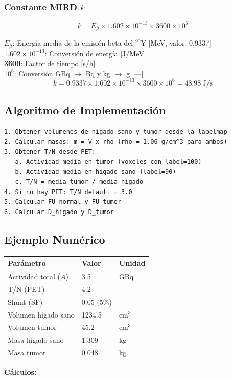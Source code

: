 \documentclass[12pt,a4paper]{article}
\newcommand{\vardef}[2]{\noindent\textbf{#1}: #2\\}
\begin{document}
\subsubsection{Constante MIRD $k$}

$$k = E_{\beta} \times 1.602\times10^{-13} \times 3600 \times 10^6$$

\vardef{$E_{\beta}$}{Energía media de la emisión beta del $^{90}$Y [MeV, valor: 0.9337]}
\vardef{$1.602\times10^{-13}$}{Conversión de energía [J/MeV]}
\vardef{3600}{Factor de tiempo [s/h]}
\vardef{$10^6$}{Conversión GBq $\to$ Bq y kg $\to$ g [---]}

$$k = 0.9337 \times 1.602\times10^{-13} \times 3600 \times 10^6 = 48.98\ \text{J/s}$$

\subsection{Algoritmo de Implementación}

\begin{verbatim}
1. Obtener volumenes de higado sano y tumor desde la labelmap
2. Calcular masas: m = V x rho (rho = 1.06 g/cm^3 para ambos)
3. Obtener T/N desde PET:
   a. Actividad media en tumor (voxeles con label=100)
   b. Actividad media en higado sano (label=90)
   c. T/N = media_tumor / media_higado
4. Si no hay PET: T/N default = 3.0
5. Calcular FU_normal y FU_tumor
6. Calcular D_higado y D_tumor
\end{verbatim}

\subsection{Ejemplo Numérico}

\begin{tabular}{p{5cm} p{3cm} p{3cm}}
\toprule
\textbf{Parámetro} & \textbf{Valor} & \textbf{Unidad} \\
\midrule
Actividad total ($A$) & 3.5 & GBq \\
T/N (PET) & 4.2 & --- \\
Shunt (SF) & 0.05 (5\%) & --- \\
Volumen hígado sano & 1234.5 & cm$^3$ \\
Volumen tumor & 45.2 & cm$^3$ \\
Masa hígado sano & 1.309 & kg \\
Masa tumor & 0.048 & kg \\
\bottomrule
\end{tabular}

\textbf{Cálculos:}
\end{document}

